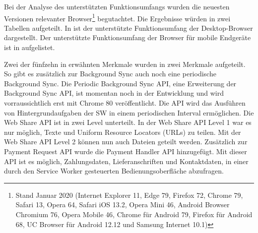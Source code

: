 Bei der Analyse des unterstützten Funktionsumfangs wurden die neuesten Versionen relevanter Browser\footnote{Stand Januar 2020 (Internet Explorer 11, Edge 79, Firefox 72, Chrome 79, Safari 13, Opera 64, Safari iOS 13.2, Opera Mini 46, Android Browser Chromium 76, Opera Mobile 46, Chrome für Android 79, Firefox für Android 68, UC Browser für Android 12.12 und Samsung Internet 10.1) }
begutachtet. Die Ergebnisse würden in zwei Tabellen aufgeteilt. In 
ist der unterstützte Funktionsumfang der Desktop-Browser dargestellt. Der unterstützte Funktionsumfang der Browser
für mobile Endgeräte ist in  aufgelistet.

Zwei der fünfzehn in  erwähnten Merkmale wurden
in zwei Merkmale aufgeteilt. So gibt es zusätzlich zur Background Sync auch noch eine
periodische Background Sync. Die Periodic Background Sync API, eine Erweiterung der Background
Sync API, ist momentan noch in der Entwicklung und wird vorraussichtlich erst mit
Chrome 80 veröffentlicht. Die API wird das Ausführen von Hintergrundaufgaben der SW
in einem periodischen Interval ermöglichen.\cite{ChromeStatusPeriodicBackgroundSync}
Die Web Share API ist in zwei Level unterteilt. In der Web Share API Level 1 war es
nur möglich, Texte und Uniform Resource Locators (URLs) zu teilen. Mit der Web Share
API Level 2 können nun auch Dateien geteilt werden.\cite{WebShareAPITwoChromeStatus}
Zusätzlich zur Payment Request API wurde die Payment Handler API hinzugefügt. Mit dieser
API ist es möglich, Zahlungsdaten, Lieferanschriften und Kontaktdaten, in einer durch
den Service Worker gesteuerten Bedienungsoberfläche abzufragen.\cite{PaymentHandlerAPIGoogleDev}

